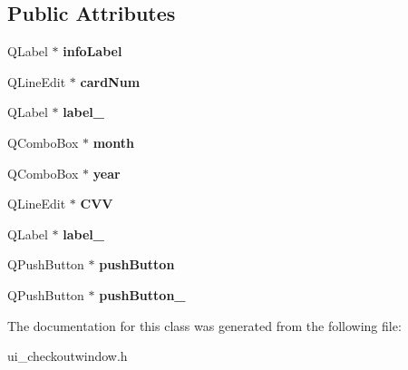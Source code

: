 \subsection*{Public Attributes}
\begin{DoxyCompactItemize}
\item 
\mbox{\label{class_ui___checkout_window_a16e806d0d1dfbe91d9c587e74ae779b2}} 
Q\+Label $\ast$ {\bfseries info\+Label}
\item 
\mbox{\label{class_ui___checkout_window_a700a00c5fb01e2e765fdfb69e4f37db0}} 
Q\+Line\+Edit $\ast$ {\bfseries card\+Num}
\item 
\mbox{\label{class_ui___checkout_window_a04080e7005b381f952831c2cb19607ff}} 
Q\+Label $\ast$ {\bfseries label\+\_}
\item 
\mbox{\label{class_ui___checkout_window_abbbfa64f1df7637a048346f3f378f576}} 
Q\+Combo\+Box $\ast$ {\bfseries month}
\item 
\mbox{\label{class_ui___checkout_window_aeafbaa39ed38da88a2d670d0ffcac02f}} 
Q\+Combo\+Box $\ast$ {\bfseries year}
\item 
\mbox{\label{class_ui___checkout_window_aedba99e9692bfc6cfc12471268610996}} 
Q\+Line\+Edit $\ast$ {\bfseries C\+VV}
\item 
\mbox{\label{class_ui___checkout_window_a48cd1d8c2c3b0421ade0cf14fc2ab0d9}} 
Q\+Label $\ast$ {\bfseries label\+\_}
\item 
\mbox{\label{class_ui___checkout_window_a584353a58c94165df30991df4b568ee1}} 
Q\+Push\+Button $\ast$ {\bfseries push\+Button}
\item 
\mbox{\label{class_ui___checkout_window_a2f25585d6f8527481b9d813edf14b672}} 
Q\+Push\+Button $\ast$ {\bfseries push\+Button\+\_}
\end{DoxyCompactItemize}


The documentation for this class was generated from the following file\+:\begin{DoxyCompactItemize}
\item 
ui\+\_\+checkoutwindow.\+h\end{DoxyCompactItemize}
